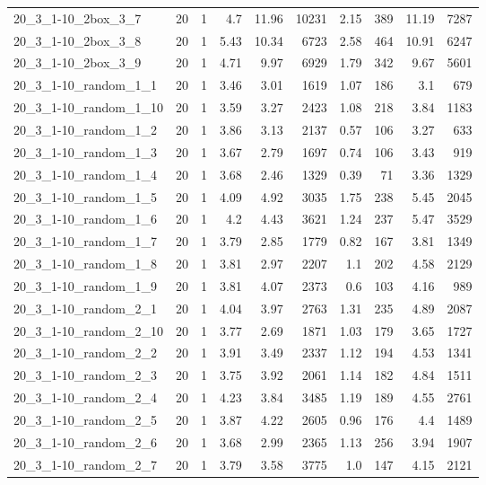 \begin{center}
\begin{scriptsize}
\begin{longtable}{lrrrrrrrrr}
20\_3\_1-10\_2box\_3\_7 & 20 & 1 & 4.7 & 11.96 & 10231 & 2.15 & 389 & 11.19 & 7287\\
20\_3\_1-10\_2box\_3\_8 & 20 & 1 & 5.43 & 10.34 & 6723 & 2.58 & 464 & 10.91 & 6247\\
20\_3\_1-10\_2box\_3\_9 & 20 & 1 & 4.71 & 9.97 & 6929 & 1.79 & 342 & 9.67 & 5601\\
20\_3\_1-10\_random\_1\_1 & 20 & 1 & 3.46 & 3.01 & 1619 & 1.07 & 186 & 3.1 & 679\\
20\_3\_1-10\_random\_1\_10 & 20 & 1 & 3.59 & 3.27 & 2423 & 1.08 & 218 & 3.84 & 1183\\
20\_3\_1-10\_random\_1\_2 & 20 & 1 & 3.86 & 3.13 & 2137 & 0.57 & 106 & 3.27 & 633\\
20\_3\_1-10\_random\_1\_3 & 20 & 1 & 3.67 & 2.79 & 1697 & 0.74 & 106 & 3.43 & 919\\
20\_3\_1-10\_random\_1\_4 & 20 & 1 & 3.68 & 2.46 & 1329 & 0.39 & 71 & 3.36 & 1329\\
20\_3\_1-10\_random\_1\_5 & 20 & 1 & 4.09 & 4.92 & 3035 & 1.75 & 238 & 5.45 & 2045\\
20\_3\_1-10\_random\_1\_6 & 20 & 1 & 4.2 & 4.43 & 3621 & 1.24 & 237 & 5.47 & 3529\\
20\_3\_1-10\_random\_1\_7 & 20 & 1 & 3.79 & 2.85 & 1779 & 0.82 & 167 & 3.81 & 1349\\
20\_3\_1-10\_random\_1\_8 & 20 & 1 & 3.81 & 2.97 & 2207 & 1.1 & 202 & 4.58 & 2129\\
20\_3\_1-10\_random\_1\_9 & 20 & 1 & 3.81 & 4.07 & 2373 & 0.6 & 103 & 4.16 & 989\\
20\_3\_1-10\_random\_2\_1 & 20 & 1 & 4.04 & 3.97 & 2763 & 1.31 & 235 & 4.89 & 2087\\
20\_3\_1-10\_random\_2\_10 & 20 & 1 & 3.77 & 2.69 & 1871 & 1.03 & 179 & 3.65 & 1727\\
20\_3\_1-10\_random\_2\_2 & 20 & 1 & 3.91 & 3.49 & 2337 & 1.12 & 194 & 4.53 & 1341\\
20\_3\_1-10\_random\_2\_3 & 20 & 1 & 3.75 & 3.92 & 2061 & 1.14 & 182 & 4.84 & 1511\\
20\_3\_1-10\_random\_2\_4 & 20 & 1 & 4.23 & 3.84 & 3485 & 1.19 & 189 & 4.55 & 2761\\
20\_3\_1-10\_random\_2\_5 & 20 & 1 & 3.87 & 4.22 & 2605 & 0.96 & 176 & 4.4 & 1489\\
20\_3\_1-10\_random\_2\_6 & 20 & 1 & 3.68 & 2.99 & 2365 & 1.13 & 256 & 3.94 & 1907\\
20\_3\_1-10\_random\_2\_7 & 20 & 1 & 3.79 & 3.58 & 3775 & 1.0 & 147 & 4.15 & 2121\\

\end{longtable}
\end{scriptsize}
\end{center}
